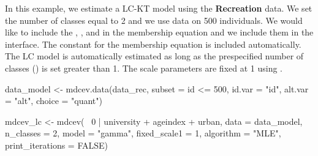 In this example, we estimate a LC-KT model using the \textbf{Recreation}
data. We set the number of classes equal to 2 and we use data on 500
individuals. We would like to include the ,
, and  in the membership equation and we
include them in the  interface. The constant for the
membership equation is included automatically. The LC model is
automatically estimated as long as the prespecified number of classes
() is set greater than 1. The scale parameters are
fixed at 1 using .

\begin{Schunk}
\begin{Sinput}
data_model <- mdcev.data(data_rec, subset = id <= 500,
                       id.var = "id",
                       alt.var = "alt",
                       choice = "quant")  

mdcev_lc <- mdcev(~ 0 | university + ageindex + urban,
                  data = data_model,
                  n_classes = 2,
                  model = "gamma",
                  fixed_scale1 = 1,
                  algorithm = "MLE",
                  print_iterations = FALSE)
\end{Sinput}
\end{Schunk}

